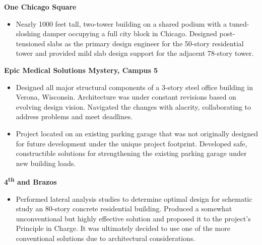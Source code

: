 \documentclass[letterpaper,6pt]{article}
\begin{document}
\textbf{\small{One Chicago Square}}
\begin{itemize}[itemsep=0.5mm,topsep=0pt]
    \item  Nearly 1000 feet tall, two-tower building on a shared podium with a tuned-sloshing 
    damper occupying a full city block in Chicago. Designed post-tensioned slabs as 
    the primary design engineer for the 50-story residential tower and provided mild slab 
    design support for the adjacent 78-story tower.
\end{itemize}
\vspace{1mm}
\textbf{\small{Epic Medical Solutions \textbar{} Mystery, Campus 5}}
\begin{itemize}[itemsep=0.5mm,topsep=0pt]
    \item  Designed all major structural components of a 3-story steel office 
    building in Verona, Wisconsin. Architecture was under constant revisions based on 
    evolving design vision. 
    Navigated the changes with alacrity, collaborating to address problems and meet 
    deadlines.
    \item  Project located on an existing parking garage that was not originally designed 
    for future development under the unique project footprint. Developed safe, 
    constructible solutions for strengthening the existing parking garage under new 
    building loads. 
\end{itemize}
\vspace{1mm}
\textbf{\small{4\textsuperscript{th} and Brazos}}
\begin{itemize}[itemsep=0.5mm,topsep=0pt]
    \item  Performed lateral analysis studies to determine optimal 
    design for schematic study an 80-story concrete residential building. Produced a 
    somewhat unconventional but highly effective solution and proposed it to the 
    project's Principle in Charge. It was ultimately decided to use one of the more 
    conventional solutions due to architectural considerations.
\end{itemize}
\end{document}
